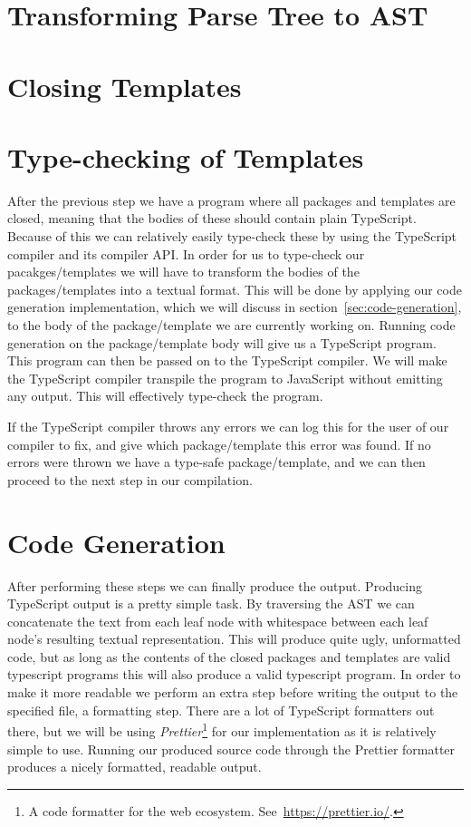 \section{Transforming Parse Tree to AST}\label{sec:transforming-parse-tree-to-ast}


\section{Closing Templates}\label{sec:closing-templates}


\section{Type-checking of Templates}\label{sec:type-checking-of-templates}

After the previous step we have a program where all packages and templates are closed, meaning that the bodies of these should contain plain TypeScript.
Because of this we can relatively easily type-check these by using the TypeScript compiler and its compiler API.
In order for us to type-check our pacakges/templates we will have to transform the bodies of the packages/templates into a textual format.
This will be done by applying our code generation implementation, which we will discuss in section~\vref{sec:code-generation}, to the body of the package/template we are currently working on.
Running code generation on the package/template body will give us a TypeScript program.
This program can then be passed on to the TypeScript compiler.
We will make the TypeScript compiler transpile the program to JavaScript without emitting any output.
This will effectively type-check the program.

If the TypeScript compiler throws any errors we can log this for the user of our compiler to fix, and give which package/template this error was found.
If no errors were thrown we have a type-safe package/template, and we can then proceed to the next step in our compilation.

\section{Code Generation}\label{sec:code-generation}

After performing these steps we can finally produce the output.
Producing TypeScript output is a pretty simple task.
By traversing the AST we can concatenate the text from each leaf node with whitespace between each leaf node's resulting textual representation.
This will produce quite ugly, unformatted code, but as long as the contents of the closed packages and templates are valid typescript programs this will also produce a valid typescript program.
In order to make it more readable we perform an extra step before writing the output to the specified file, a formatting step.
There are a lot of TypeScript formatters out there, but we will be using \textit{Prettier}\footnote{A code formatter for the web ecosystem. See~\url{https://prettier.io/}.} for our implementation as it is relatively simple to use.
Running our produced source code through the Prettier formatter produces a nicely formatted, readable output.

